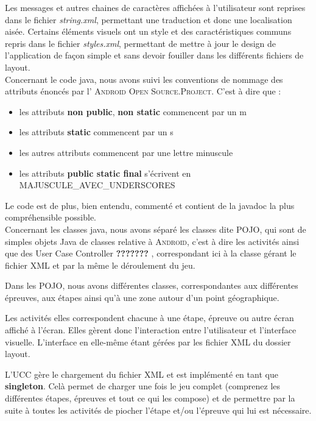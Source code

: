 \documentclass[11pt]{scrreprt}
\begin{document}
    Les messages et autres chaines de caractères affichées à l'utilisateur sont reprises dans le fichier \textit{string.xml}, permettant une traduction et donc une localisation aisée. Certains éléments visuels ont un style et des caractéristiques communs repris dans le fichier \textit{styles.xml}, permettant de mettre à jour le design de l'application de façon simple et sans devoir fouiller dans les différents fichiers de layout.\\

    Concernant le code java, nous avons suivi les conventions de nommage des attributs énoncés par l' \textsc{Android Open Source.Project}. C'est à dire que :
    \begin{itemize}
        \item les attributs \textbf{non public}, \textbf{non static} commencent par un m
        \item les attributs \textbf{static} commencent par un s
        \item les autres attributs commencent par une lettre minuscule
        \item les attributs \textbf{public static final} s'écrivent en MAJUSCULE\_AVEC\_UNDERSCORES
    \end{itemize}

    Le code est de plus, bien entendu, commenté et contient de la javadoc la plus compréhensible possible.\\

    Concernant les classes java, nous avons séparé les classes dite \og POJO\fg, qui sont de simples objets Java de classes relative à \textsc{Android}, c'est à dire les activités ainsi que des \og User Case Controller\fg{} \textbf{???????} , correspondant ici à la classe gérant le fichier XML et par la même le déroulement du jeu.

    Dans les POJO, nous avons différentes classes, correspondantes aux différentes épreuves, aux étapes ainsi qu'à une zone autour d'un point géographique.

    Les activités elles correspondent chacune à une étape, épreuve ou autre écran affiché à l'écran. Elles gèrent donc l'interaction entre l'utilisateur et l'interface visuelle. L'interface en elle-même étant gérées par les fichier XML du dossier layout.

    L'UCC gère le chargement du fichier XML et est implémenté en tant que \textbf{singleton}. Celà permet de charger une fois le jeu complet (comprenez les différentes étapes, épreuves et tout ce qui les compose) et de permettre par la suite à toutes les activités de piocher l'étape et/ou l'épreuve qui lui est nécessaire.
\end{document}
